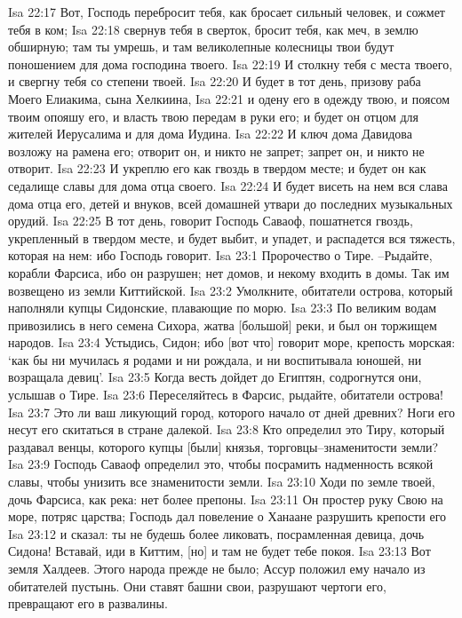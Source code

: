 Isa 22:17  Вот, Господь перебросит тебя, как бросает сильный человек, и сожмет тебя в ком;
Isa 22:18  свернув тебя в сверток, бросит тебя, как меч, в землю обширную; там ты умрешь, и там великолепные колесницы твои будут поношением для дома господина твоего.
Isa 22:19  И столкну тебя с места твоего, и свергну тебя со степени твоей.
Isa 22:20  И будет в тот день, призову раба Моего Елиакима, сына Хелкиина,
Isa 22:21  и одену его в одежду твою, и поясом твоим опояшу его, и власть твою передам в руки его; и будет он отцом для жителей Иерусалима и для дома Иудина.
Isa 22:22  И ключ дома Давидова возложу на рамена его; отворит он, и никто не запрет; запрет он, и никто не отворит.
Isa 22:23  И укреплю его как гвоздь в твердом месте; и будет он как седалище славы для дома отца своего.
Isa 22:24  И будет висеть на нем вся слава дома отца его, детей и внуков, всей домашней утвари до последних музыкальных орудий.
Isa 22:25  В тот день, говорит Господь Саваоф, пошатнется гвоздь, укрепленный в твердом месте, и будет выбит, и упадет, и распадется вся тяжесть, которая на нем: ибо Господь говорит.
Isa 23:1  Пророчество о Тире. --Рыдайте, корабли Фарсиса, ибо он разрушен; нет домов, и некому входить в домы. Так им возвещено из земли Киттийской.
Isa 23:2  Умолкните, обитатели острова, который наполняли купцы Сидонские, плавающие по морю.
Isa 23:3  По великим водам привозились в него семена Сихора, жатва [большой] реки, и был он торжищем народов.
Isa 23:4  Устыдись, Сидон; ибо [вот что] говорит море, крепость морская: `как бы ни мучилась я родами и ни рождала, и ни воспитывала юношей, ни возращала девиц'.
Isa 23:5  Когда весть дойдет до Египтян, содрогнутся они, услышав о Тире.
Isa 23:6  Переселяйтесь в Фарсис, рыдайте, обитатели острова!
Isa 23:7  Это ли ваш ликующий город, которого начало от дней древних? Ноги его несут его скитаться в стране далекой.
Isa 23:8  Кто определил это Тиру, который раздавал венцы, которого купцы [были] князья, торговцы--знаменитости земли?
Isa 23:9  Господь Саваоф определил это, чтобы посрамить надменность всякой славы, чтобы унизить все знаменитости земли.
Isa 23:10  Ходи по земле твоей, дочь Фарсиса, как река: нет более препоны.
Isa 23:11  Он простер руку Свою на море, потряс царства; Господь дал повеление о Ханаане разрушить крепости его
Isa 23:12  и сказал: ты не будешь более ликовать, посрамленная девица, дочь Сидона! Вставай, иди в Киттим, [но] и там не будет тебе покоя.
Isa 23:13  Вот земля Халдеев. Этого народа прежде не было; Ассур положил ему начало из обитателей пустынь. Они ставят башни свои, разрушают чертоги его, превращают его в развалины.
